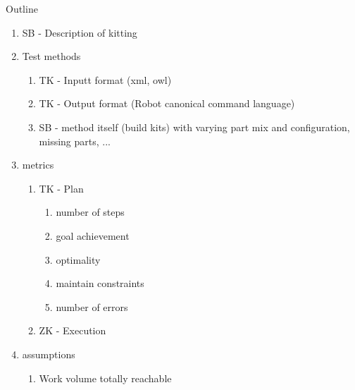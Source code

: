 \begin {center}
{\huge{Outline}}
\end {center}

\begin{enumerate}
\item SB - Description of kitting
\item Test methods
	\begin{enumerate}
	\item TK -  Inputt format (xml, owl)
	\item TK - Output format (Robot canonical command language)
	\item SB - method itself (build kits) with varying part mix and configuration, missing parts, ...
	\end{enumerate}
\item metrics
	\begin{enumerate}
	\item TK -  Plan
		\begin{enumerate}
		\item number of steps
		\item goal achievement
		\item optimality
		\item maintain constraints
		\item number of errors
		\end {enumerate}
	\item ZK -  Execution
	\end {enumerate}
\item assumptions
	\begin {enumerate}
	\item Work volume totally reachable
	\end {enumerate}
\end{enumerate}

